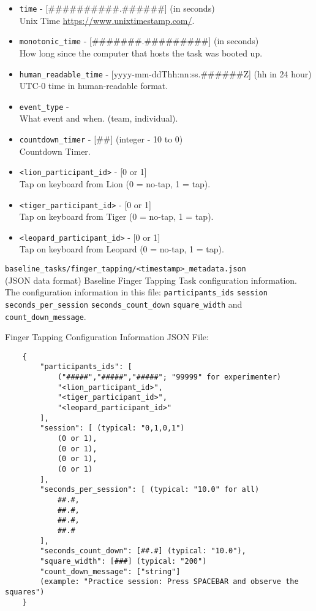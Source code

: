 \begin{description}
\begin{itemize}
    \item \verb|time| - [\#\#\#\#\#\#\#\#\#\#.\#\#\#\#\#\#] (in seconds)\\
		Unix Time \url{https://www.unixtimestamp.com/}.
    \item \verb|monotonic_time| - [\#\#\#\#\#\#\#.\#\#\#\#\#\#\#\#\#] (in seconds)\\
		How long since the computer that hosts the task was booted up.
    \item \verb|human_readable_time| - [yyyy-mm-ddThh:nn:ss.\#\#\#\#\#\#Z] (hh in 24 hour)\\
		 UTC-0 time in human-readable format.
    \item \verb|event_type| -\\
		What event and when. (team, individual).
    \item \verb|countdown_timer| - [\#\#] (integer - 10 to 0)\\
		Countdown Timer.
    \item \verb|<lion_participant_id>| - [0 or 1]\\
		Tap on keyboard from Lion (0 = no-tap, 1 = tap).
    \item \verb|<tiger_participant_id>| - [0 or 1]\\
		Tap on keyboard from Tiger (0 = no-tap, 1 = tap).
    \item \verb|<leopard_participant_id>| - [0 or 1]\\
		Tap on keyboard from Leopard (0 = no-tap, 1 = tap).
\end{itemize}


\medskip
\item\verb|baseline_tasks/finger_tapping/<timestamp>_metadata.json|\\
    (JSON data format) Baseline Finger Tapping Task configuration information.
    The configuration information in this file: \verb|participants_ids|
    \verb|session| \verb|seconds_per_session| \verb|seconds_count_down|
    \verb|square_width| and \verb|count_down_message|.

\noindent Finger Tapping Configuration Information JSON File:

\begin{verbatim}
    {
        "participants_ids": [
            ("#####","#####","#####"; "99999" for experimenter)
            "<lion_participant_id>",
            "<tiger_participant_id>",
            "<leopard_participant_id>"
        ],
        "session": [ (typical: "0,1,0,1")
            (0 or 1),
            (0 or 1),
            (0 or 1),
            (0 or 1)
        ],
        "seconds_per_session": [ (typical: "10.0" for all)
            ##.#,
            ##.#,
            ##.#,
            ##.#
        ],
        "seconds_count_down": [##.#] (typical: "10.0"),
        "square_width": [###] (typical: "200")
        "count_down_message": ["string"]
        (example: "Practice session: Press SPACEBAR and observe the squares")
    }
\end{verbatim}




\end{description}
